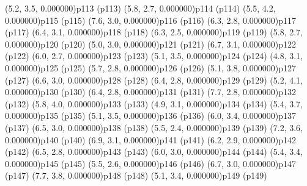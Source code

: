 \psPoint(5.2, 3.5, 0.000000){p113}
\psdot(p113)
\psPoint(5.8, 2.7, 0.000000){p114}
\psdot(p114)
\psPoint(5.5, 4.2, 0.000000){p115}
\psdot(p115)
\psPoint(7.6, 3.0, 0.000000){p116}
\psdot(p116)
\psPoint(6.3, 2.8, 0.000000){p117}
\psdot(p117)
\psPoint(6.4, 3.1, 0.000000){p118}
\psdot(p118)
\psPoint(6.3, 2.5, 0.000000){p119}
\psdot(p119)
\psPoint(5.8, 2.7, 0.000000){p120}
\psdot(p120)
\psPoint(5.0, 3.0, 0.000000){p121}
\psdot(p121)
\psPoint(6.7, 3.1, 0.000000){p122}
\psdot(p122)
\psPoint(6.0, 2.7, 0.000000){p123}
\psdot(p123)
\psPoint(5.1, 3.5, 0.000000){p124}
\psdot(p124)
\psPoint(4.8, 3.1, 0.000000){p125}
\psdot(p125)
\psPoint(5.7, 2.8, 0.000000){p126}
\psdot(p126)
\psPoint(5.1, 3.8, 0.000000){p127}
\psdot(p127)
\psPoint(6.6, 3.0, 0.000000){p128}
\psdot(p128)
\psPoint(6.4, 2.8, 0.000000){p129}
\psdot(p129)
\psPoint(5.2, 4.1, 0.000000){p130}
\psdot(p130)
\psPoint(6.4, 2.8, 0.000000){p131}
\psdot(p131)
\psPoint(7.7, 2.8, 0.000000){p132}
\psdot(p132)
\psPoint(5.8, 4.0, 0.000000){p133}
\psdot(p133)
\psPoint(4.9, 3.1, 0.000000){p134}
\psdot(p134)
\psPoint(5.4, 3.7, 0.000000){p135}
\psdot(p135)
\psPoint(5.1, 3.5, 0.000000){p136}
\psdot(p136)
\psPoint(6.0, 3.4, 0.000000){p137}
\psdot(p137)
\psPoint(6.5, 3.0, 0.000000){p138}
\psdot(p138)
\psPoint(5.5, 2.4, 0.000000){p139}
\psdot(p139)
\psPoint(7.2, 3.6, 0.000000){p140}
\psdot(p140)
\psPoint(6.9, 3.1, 0.000000){p141}
\psdot(p141)
\psPoint(6.2, 2.9, 0.000000){p142}
\psdot(p142)
\psPoint(6.5, 2.8, 0.000000){p143}
\psdot(p143)
\psPoint(6.0, 3.0, 0.000000){p144}
\psdot(p144)
\psPoint(5.4, 3.4, 0.000000){p145}
\psdot(p145)
\psPoint(5.5, 2.6, 0.000000){p146}
\psdot(p146)
\psPoint(6.7, 3.0, 0.000000){p147}
\psdot(p147)
\psPoint(7.7, 3.8, 0.000000){p148}
\psdot(p148)
\psPoint(5.1, 3.4, 0.000000){p149}
\psdot(p149)
